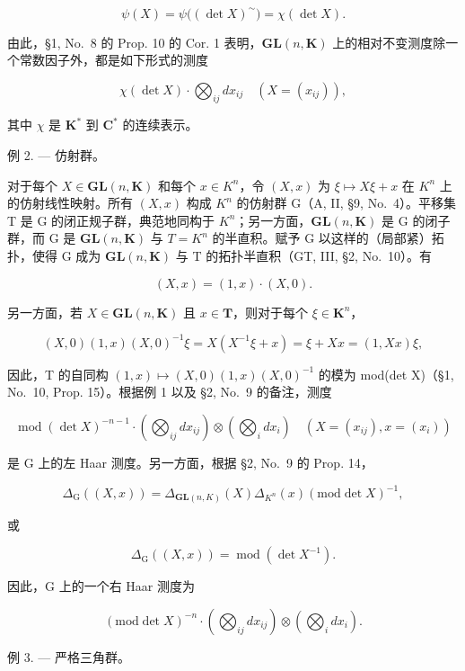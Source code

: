 \[
\psi (X) = \psi \big ((\det X) ^ {\sim} \big) = \chi (\det X).
\]

由此，§1, No.~8 的 Prop. 10 的 Cor. 1 表明，\(\mathbf{GL}(n,\mathbf{K})\) 上的相对不变测度除一个常数因子外，都是如下形式的测度

\[
\chi (\det X) \cdot \bigotimes_ {i j} d x _ {i j} \quad (X = (x _ {i j})),\tag{4}
\]

其中 \(\chi\) 是 \(\mathbf{K}^*\) 到 \(\mathbf{C}^*\) 的连续表示。

例 2. --- 仿射群。

对于每个 \(X \in \mathbf{GL}(n, \mathbf{K})\) 和每个 \(x \in K^{n}\)，令 \((X, x)\) 为 \(\xi \mapsto X\xi + x\) 在 \(K^{n}\) 上的仿射线性映射。所有 \((X, x)\) 构成 \(K^{n}\) 的仿射群 G（A, II, §9, No.~4）。平移集 T 是 G 的闭正规子群，典范地同构于 \(K^{n}\)；另一方面，\(\mathbf{GL}(n, \mathbf{K})\) 是 G 的闭子群，而 G 是 \(\mathbf{GL}(n, \mathbf{K})\) 与 \(T = K^{n}\) 的半直积。赋予 G 以这样的（局部紧）拓扑，使得 G 成为 \(\mathbf{GL}(n, \mathbf{K})\) 与 T 的拓扑半直积（GT, III, §2, No.~10）。有

\[
(X, x) = (1, x) \cdot (X, 0).
\]

另一方面，若 \(X \in \mathbf{GL}(n, \mathbf{K})\) 且 \(x \in \mathbf{T}\)，则对于每个 \(\xi \in \mathbf{K}^n\)，

\[
(X, 0) (1, x) (X, 0) ^ {- 1} \xi = X (X ^ {- 1} \xi + x) = \xi + X x = (1, X x) \xi ,
\]

因此，T 的自同构 \((1,x)\mapsto(X,0)(1,x)(X,0)^{-1}\) 的模为 mod(det X)（§1, No.~10, Prop. 15）。根据例 1 以及 §2, No.~9 的备注，测度

\[
\operatorname{mod} (\det X) ^ {- n - 1} \cdot \left(\bigotimes_ {i j} d x _ {i j}\right) \otimes \left(\bigotimes_ {i} d x _ {i}\right) \quad (X = (x _ {i j}), x = (x _ {i}))\tag{5}
\]

是 G 上的左 Haar 测度。另一方面，根据 §2, No.~9 的 Prop. 14，

\[
\Delta_ {\mathrm{G}} ((X, x)) = \Delta_ {\mathbf {G L} (n, K)} (X) \Delta_ {K ^ {n}} (x) (\mathrm{mod} \det X) ^ {- 1},
\]

或

\[
\Delta_ {\mathrm{G}} ((X, x)) = \operatorname{mod} (\det X ^ {- 1}).\tag{6}
\]

因此，G 上的一个右 Haar 测度为

\[
(\mathrm{mod} \det X) ^ {- n} \cdot \left(\bigotimes_ {i j} d x _ {i j}\right) \otimes \left(\bigotimes_ {i} d x _ {i}\right).\tag{7}
\]

例 3. --- 严格三角群。

